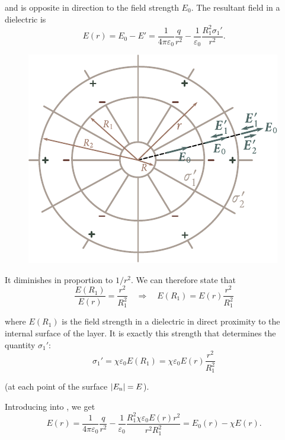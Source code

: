 \noindent
and is opposite in direction to the field strength $E_0$. The resultant field in a dielectric is
\begin{equation}\label{eq:2_39}
    E(r) = E_0 - E' = \frac{1}{4\pi\varepsilon_0} \frac{q}{r^2} - \frac{1}{\varepsilon_0} \frac{R_1^2 \sigma_1'}{r^2}.
\end{equation}

\begin{figure}[t]
	\begin{center}
		\includegraphics[scale=1.0]{figures/ch_02/fig_2_6.pdf}
		\caption[]{}
		\label{fig:2_6}
	\end{center}
	\vspace{-0.8cm}
\end{figure}

\noindent
It diminishes in proportion to $1/r^2$. We can therefore state that
\begin{equation*}
    \frac{E(R_1)}{E(r)} = \frac{r^2}{R_1^2}\quad \Rightarrow\quad E(R_1) = E(r) \frac{r^2}{R_1^2}
\end{equation*}

\noindent
where $E(R_1)$ is the field strength in a dielectric in direct proximity to the internal surface of the layer. It is exactly this strength that determines the quantity $\sigma_1'$:
\begin{equation}\label{eq:2_40}
    \sigma_1' = \chi\varepsilon_0 E(R_1) = \chi\varepsilon_0 E(r) \frac{r^2}{R_1^2}
\end{equation}

\noindent
(at each point of the surface $|E_{\text{n}}|=E$).

Introducing  into , we get
\begin{equation*}
    E(r) = \frac{1}{4\pi\varepsilon_0} \frac{q}{r^2} - \frac{1}{\varepsilon_0} \frac{R_1^2 \chi \varepsilon_0 E(r) r^2}{r^2 R_1^2} = E_0(r) - \chi E(r).
\end{equation*}

